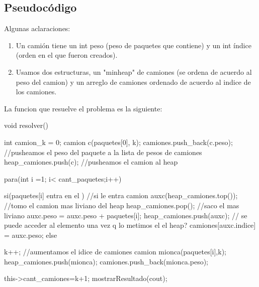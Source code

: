\subsection{Pseudoc\'odigo}

Algunas aclaraciones:

\begin{enumerate}[1.]
\item Un cami\'on tiene un int peso (peso de paquetes que contiene) y un int \'indice (orden en el que fueron creados).
\item Usamos dos estructuras, un "minheap" de camiones (se ordena de acuerdo al peso del camion) y un arreglo de camiones ordenado de acuerdo al indice de los camiones. 
\end{enumerate}

La funcion que resuelve el problema es la siguiente:


void resolver(){
	
	int camion_k = 0;  
	camion c(paquetes[0], k);
	camiones.push_back(c.peso);  //pusheamos el peso del paquete a la lista de pesos de camiones
	heap_camiones.push(c);	    //pusheamos el camion al heap
	

	
	para(int i =1; i< cant_paquetes;i++){
		si(paquetes[i] entra en el  ){ //si le entra
				camion auxc(heap_camiones.top()); //tomo el camion mas liviano del heap
				heap_camiones.pop(); //saco el mas liviano
				auxc.peso = auxc.peso + paquetes[i];
				heap_camiones.push(auxc);  // se puede acceder al elemento una vez q lo metimos el el heap?
				camiones[auxc.indice] = auxc.peso;
		}else{
				k++; //aumentamos el idice de camiones
				camion mionca(paquetes[i],k);
				heap_camiones.push(mionca);
				camiones.push_back(mionca.peso);
			
		}
	}
	this->cant_camiones=k+1;
	mostrarResultado(cout);
	
}

